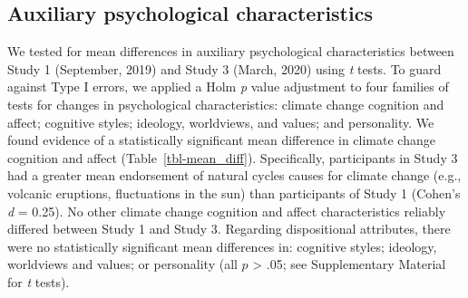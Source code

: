 \documentclass[
  letterpaper,
  DIV=11,
  numbers=noendperiod]{scrartcl}
\begin{document}
\subsection{Auxiliary psychological
characteristics}\label{auxiliary-psychological-characteristics}

We tested for mean differences in auxiliary psychological
characteristics between Study 1 (September, 2019) and Study 3 (March,
2020) using \emph{t} tests. To guard against Type I errors, we applied a
Holm \citeyearpar{holm1979} \emph{p} value adjustment to four families
of tests for changes in psychological characteristics: climate change
cognition and affect; cognitive styles; ideology, worldviews, and
values; and personality. We found evidence of a statistically
significant mean difference in climate change cognition and affect
(Table~\ref{tbl-mean_diff}). Specifically, participants in Study 3 had a
greater mean endorsement of natural cycles causes for climate change
(e.g., volcanic eruptions, fluctuations in the sun) than participants of
Study 1 (Cohen's \emph{d} = 0.25). No other climate change cognition and
affect characteristics reliably differed between Study 1 and Study 3.
Regarding dispositional attributes, there were no statistically
significant mean differences in: cognitive styles; ideology, worldviews
and values; or personality (all \(p\) \textgreater{} .05; see
Supplementary Material for \emph{t} tests).
\end{document}
